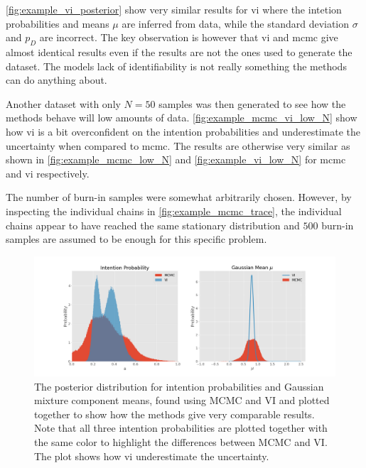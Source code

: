 \cref{fig:example_vi_posterior} show very similar results for \acrshort{vi} where the intetion probabilities and means $\mu$ are inferred from data, while the standard deviation $\sigma$ and $p_D$ are incorrect. The key observation is however that \acrshort{vi} and \acrshort{mcmc} give almost identical results even if the results are not the ones used to generate the dataset. The models lack of identifiability is not really something the methods can do anything about.

Another dataset with only $N=50$ samples was then generated to see how the methods behave will low amounts of data. \cref{fig:example_mcmc_vi_low_N} show how \acrshort{vi} is a bit overconfident on the intention probabilities and underestimate the uncertainty when compared to \acrshort{mcmc}. The results are otherwise very similar as shown in \cref{fig:example_mcmc_low_N} and \cref{fig:example_vi_low_N} for \acrshort{mcmc} and \acrshort{vi} respectively.

The number of burn-in samples were somewhat arbitrarily chosen. However, by inspecting the individual chains in \cref{fig:example_mcmc_trace}, the individual chains appear to have reached the same stationary distribution and $500$ burn-in samples are assumed to be enough for this specific problem. 

\begin{figure}[h]
    \centering
    \includegraphics[width=\textwidth]{figures/example_vi_mcmc_comparison.png}
    \caption{The posterior distribution for intention probabilities and Gaussian mixture component means, found using MCMC and VI and plotted together to show how the methods give very comparable results. Note that all three intention probabilities are plotted together with the same color to highlight the differences between MCMC and VI. The plot shows how \acrshort{vi} underestimate the uncertainty.}
    \label{fig:example_mcmc_vi_alphas}
\end{figure}

